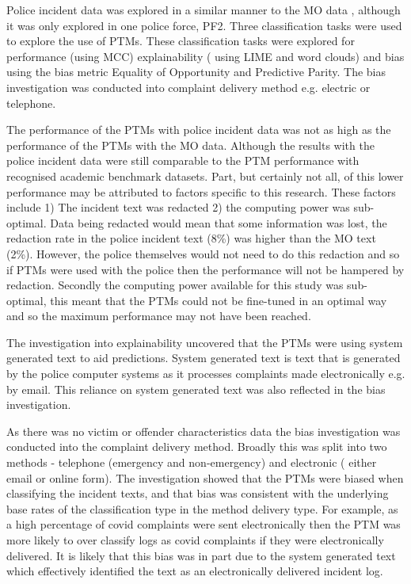 Police incident data was explored in a similar manner to the MO data , although it was only explored in one police force, PF2. Three classification tasks were used to explore the use of PTMs. These classification tasks were explored for performance (using MCC) explainability ( using LIME and word clouds) and bias using the bias metric Equality of Opportunity and Predictive Parity. The bias investigation was conducted into complaint delivery method e.g. electric or telephone.

The performance of the PTMs with police incident data was not as high as the performance of the PTMs with the MO data. Although the results with the police incident data were still comparable to the PTM performance with recognised academic benchmark datasets. Part, but certainly not all,  of this lower performance may be attributed to factors specific to this research. These factors include 1) The incident text was redacted 2) the computing power was sub-optimal. Data being redacted would mean that some information was lost, the redaction rate in the police incident text (8\%)  was higher than the MO text (2\%). However, the police themselves would not need to do this redaction and so if PTMs were used with the police then the performance will not be hampered by redaction. Secondly the computing power available for this study was sub-optimal, this meant that the PTMs could not be fine-tuned in an optimal way and so the maximum performance may not have been reached. 

The investigation into explainability uncovered that the PTMs were using system generated text to aid predictions. System generated text is text that is generated by the police computer systems as it processes complaints made electronically e.g. by email. This reliance on system generated text was also reflected in the bias investigation.

As there was no victim or offender characteristics data the bias investigation was conducted into the complaint delivery method. Broadly this was split into two methods - telephone (emergency and non-emergency) and electronic ( either email or online form). The investigation showed that the PTMs were biased when classifying the incident texts, and that bias was consistent with the underlying base rates of the classification type in the method delivery type. For example, as a high percentage of covid complaints were sent electronically then the PTM was more likely to over classify logs as covid complaints if they were electronically delivered.  It is likely that this bias was in part due to the system generated text which effectively identified the text as an electronically delivered incident log.

